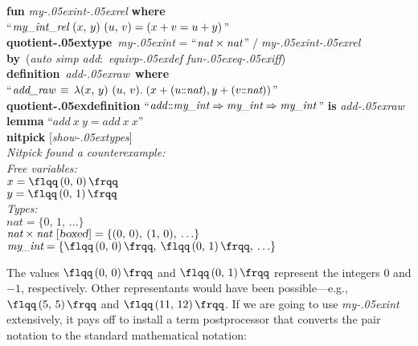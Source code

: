 \documentclass[a4paper,12pt]{article}
\def\Colon{\mathord{:\mkern-1.5mu:}}
\def\unr{\ldots}
\def\Abs#1{\hbox{\rm{\flqq}}{\,#1\,}\hbox{\rm{\frqq}}}
\renewcommand\_{\hbox{\textunderscore\kern-.05ex}}
\begin{document}
\prew
\textbf{fun} \textit{my\_int\_rel} \textbf{where} \\
``$\textit{my\_int\_rel}~(x,\, y)~(u,\, v) = (x + v = u + y)$'' \\[2\smallskipamount]
%
\textbf{quotient\_type}~\textit{my\_int} = ``$\textit{nat} \times \textit{nat\/}$''$\;{/}\;$\textit{my\_int\_rel} \\
\textbf{by}~(\textit{auto simp add\/}:\ \textit{equivp\_def fun\_eq\_iff}) \\[2\smallskipamount]
%
\textbf{definition}~\textit{add\_raw}~\textbf{where} \\
``$\textit{add\_raw} \,\equiv\, \lambda(x,\, y)~(u,\, v).\; (x + (u\Colon\textit{nat}), y + (v\Colon\textit{nat}))$'' \\[2\smallskipamount]
%
\textbf{quotient\_definition} ``$\textit{add\/}\Colon\textit{my\_int} \Rightarrow \textit{my\_int} \Rightarrow \textit{my\_int\/}$'' \textbf{is} \textit{add\_raw} \\[2\smallskipamount]
%
\textbf{lemma} ``$\textit{add}~x~y = \textit{add}~x~x$'' \\
\textbf{nitpick} [\textit{show\_types}] \\[2\smallskipamount]
\slshape Nitpick found a counterexample: \\[2\smallskipamount]
\hbox{}\qquad Free variables: \nopagebreak \\
\hbox{}\qquad\qquad $x = \Abs{(0,\, 0)}$ \\
\hbox{}\qquad\qquad $y = \Abs{(0,\, 1)}$ \\
\hbox{}\qquad Types: \\
\hbox{}\qquad\qquad $\textit{nat} = \{0,\, 1,\, \unr\}$ \\
\hbox{}\qquad\qquad $\textit{nat} \times \textit{nat}~[\textsl{boxed\/}] = \{(0,\, 0),\> (1,\, 0),\> \unr\}$ \\
\hbox{}\qquad\qquad $\textit{my\_int} = \{\Abs{(0,\, 0)},\> \Abs{(0,\, 1)},\> \unr\}$
\postw

The values $\Abs{(0,\, 0)}$ and $\Abs{(0,\, 1)}$ represent the
integers $0$ and $-1$, respectively. Other representants would have been
possible---e.g., $\Abs{(5,\, 5)}$ and $\Abs{(11,\, 12)}$. If we are going to
use \textit{my\_int} extensively, it pays off to install a term postprocessor
that converts the pair notation to the standard mathematical notation:
\end{document}

